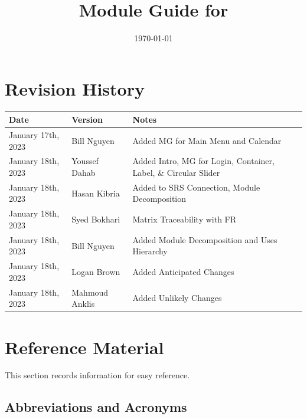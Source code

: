 \documentclass[12pt, titlepage]{article}
\begin{document}
\title{Module Guide for \progname{}} 
\author{\authname}
\date{\today}

\maketitle


\section{Revision History}

\begin{tabularx}{\textwidth}{p{3cm}p{2cm}X}
	\toprule {\bf Date} & {\bf Version} & {\bf Notes}\\
	\midrule
	January 17th, 2023 & Bill Nguyen  & Added MG for Main Menu and Calendar\\
	January 18th, 2023 & Youssef Dahab & Added Intro, MG for Login, Container, Label, \& Circular Slider\\
	January 18th, 2023 & Hasan Kibria & Added to SRS Connection, Module Decomposition\\	
	January 18th, 2023 & Syed Bokhari & Matrix Traceability with FR\\	
	January 18th, 2023 & Bill Nguyen  & Added Module Decomposition and Uses Hierarchy\\
	January 18th, 2023 & Logan Brown  & Added Anticipated Changes\\
	January 18th, 2023 & Mahmoud Anklis  & Added Unlikely Changes\\
\bottomrule
\end{tabularx}

\newpage

\section{Reference Material}

This section records information for easy reference.

\subsection{Abbreviations and Acronyms}
\end{document}
